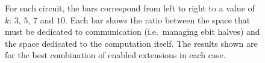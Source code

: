 \begin{figure}
\centering
{}
\caption{For each circuit, the bars correspond from left to right to a value of \(k\): \(3\), \(5\), \(7\) and \(10\). Each bar shows the ratio between the space that must be dedicated to communication (i.e.\ managing ebit halves) and the space dedicated to the computation itself. The results shown are for the best combination of enabled extensions in each case.}
\label{fig:results4}
\end{figure}
